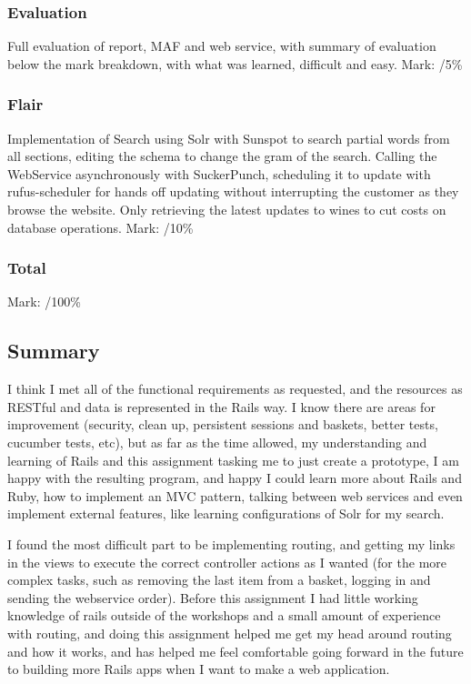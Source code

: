 \documentclass[12pt]{article}
\begin{document}
\subsubsection{Evaluation}
Full evaluation of report, MAF and web service, with summary of evaluation below the mark breakdown, with what was learned, difficult and easy.
Mark: /5\%

\subsubsection{Flair}
Implementation of Search using Solr with Sunspot to search partial words from all sections, editing the schema to change the gram of the search. Calling the WebService asynchronously with SuckerPunch, scheduling it to update with rufus-scheduler for hands off updating without interrupting the customer as they browse the website. Only retrieving the latest updates to wines to cut costs on database operations.
Mark: /10\%

\subsubsection{Total}
Mark: /100\%

\subsection{Summary}
I think I met all of the functional requirements as requested, and the resources as RESTful and data is represented in the Rails way. I know there are areas for improvement (security, clean up, persistent sessions and baskets, better tests, cucumber tests, etc), but as far as the time allowed, my understanding and learning of Rails and this assignment tasking me to just create a prototype, I am happy with the resulting program, and happy I could learn more about Rails and Ruby, how to implement an MVC pattern, talking between web services and even implement external features, like learning configurations of Solr for my search.

I found the most difficult part to be implementing routing, and getting my links in the views to execute the correct controller actions as I wanted (for the more complex tasks, such as removing the last item from a basket, logging in and sending the webservice order). Before this assignment I had little working knowledge of rails outside of the workshops and a small amount of experience with routing, and doing this assignment helped me get my head around routing and how it works, and has helped me feel comfortable going forward in the future to building more Rails apps when I want to make a web application. 
\end{document}

